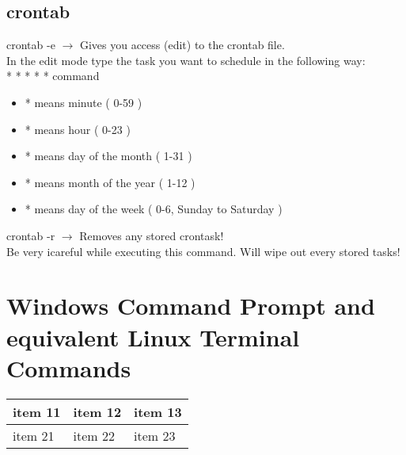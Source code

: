 \documentclass[twoside,a4paper]{article}
\newcommand{\tcb}{\color{blue}}
\newcommand{\tcc}{\color{cyan}}
\newcommand{\tcr}{\color{red}}
\newcommand{\tcg}{\color{gray}}
\newcommand{\tck}{\color{black}}
\newcommand{\ra }{$\rightarrow$ }
\newcommand{\hs}{\hspace}
\begin{document}
\begin{multicols}{2}
\tcc \section{crontab}
	\hs{-0.5 cm}\tcr crontab \tcb  -e \tck 
	\ra Gives you access (edit) to the \tcr  crontab 
	\tck  file.\\
	In the edit mode type the task you want to schedule in the following 
	way:\\
	\tcr  \tcb  * \tcr  * \color{green} * 
	\color{magenta} * \tcg  * \tck  command 
	\tck 
	\begin{itemize}
		\item \tcb  * \tck  means minute ( 0-59 )
		\item \tcr   * \tck  means hour ( 0-23 )
		\item \color{green} * \tck  means day of the month
		( 1-31 )
		\item \color{magenta} * \tck  means month of the 
		year ( 1-12 )
		\item \tcg  * \tck  means day of the week
		( 0-6, Sunday to Saturday )
	\end{itemize}

	\hs{-0.7 cm} \tcr crontab \tcb  -r \tck 
	\ra Removes any stored crontask! \tcg \\
	Be very icareful while executing this command. Will wipe out every 
	stored tasks!
\end{multicols}

	\newpage

	\tcc \section{Windows Command Prompt and equivalent Linux Terminal Commands}
	\begin{tabularx}{0.8\textwidth} { 
  		| >{\raggedright\arraybackslash}X 
  		| >{\centering\arraybackslash}X 
  		| >{\raggedleft\arraybackslash}X | }
 		\hline
 		item 11 & item 12 & item 13 \\
 		\hline
 		item 21  & item 22  & item 23  \\
	\hline
	\end{tabularx}
\end{document}
